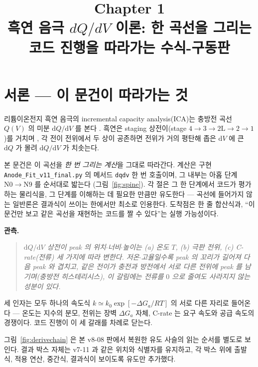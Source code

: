 \documentclass[11pt,a4paper]{article}
\title{\textbf{\LARGE Chapter 1}\\[0.35em]\Large 흑연 음극 $dQ/dV$ 이론: 한 곡선을 그리는 코드 진행을 따라가는 수식-구동판}
\author{}
\date{}
\newcommand{\dd}{\mathrm{d}}
\newcommand{\code}[1]{\texttt{#1}}
\begin{document}
\maketitle

\section*{서론 — 이 문건이 따라가는 것}
리튬이온전지 흑연 음극의 incremental capacity analysis(ICA)는 충방전 곡선 $Q(V)$ 의 미분
$\dd Q/\dd V$ 를 본다 \cite{bloom2005,dubarry2012}. 흑연은 staging 상전이(stage
$4\!\to\!3\!\to\!2\mathrm L\!\to\!2\!\to\!1$)를 거치며 \cite{dahn1991,ohzuku1993}, 각 전이 전위에서
두 상이 공존하면 전위가 거의 평탄해 좁은 $\dd V$ 에 큰 $\dd Q$ 가 몰려 $\dd Q/\dd V$ 가 치솟는다.

본 문건은 이 곡선을 \emph{한 번 그리는 계산}을 그대로 따라간다. 계산은 구현 \code{Anode\_Fit\_v11\_final.py}
의 메서드 \code{dqdv} 한 번 호출이며, 그 내부는 아홉 단계 $\mathrm N0\!\to\!\mathrm N9$ 를 순서대로 밟는다
(그림~\ref{fig:spine}). 각 절은 그 한 단계에서 코드가 평가하는 물리식을, 그 단계를 이해하는 데 필요한 만큼만
유도한다 — 곡선에 들어가지 않는 일반론은 결과식이 쓰이는 한에서만 최소로 인용한다. 도착점은 한 줄 합산식과,
``이 문건만 보고 같은 곡선을 재현하는 코드를 짤 수 있다''는 실행 가능성이다.

\textbf{관측.}
\begin{quote}\itshape
$\dd Q/\dd V$ 상전이 peak 의 위치$\cdot$너비$\cdot$높이는 (a) 온도 $T$, (b) 극판 전위, (c) C-rate(전류)
세 가지에 따라 변한다. 저온$\cdot$고율일수록 peak 의 꼬리가 길어져 다음 peak 와 겹치고, 같은 전이가 충전과 방전에서
서로 다른 전위에 peak 를 남기며(충방전 히스테리시스), 이 갈림에는 전류를 $0$ 으로 줄여도 사라지지 않는 성분이 있다.
\end{quote}

세 인자는 모두 하나의 속도식 $k\simeq k_0\exp[-\Delta G_a/RT]$ 의 서로 다른 자리로 들어온다 — 온도는 지수의 분모,
전위는 장벽 $\Delta G_a$ 자체, C-rate 는 요구 속도와 공급 속도의 경쟁이다. 코드 진행이 이 세 갈래를 차례로 닫는다.

그림~\ref{fig:derivechain} 은 본 v8-08 판에서 복원한 유도 사슬의 읽는 순서를 별도로 보인다. 결과 박스 자체는 v7-11 과 같은 위치와 식별자를 유지하고, 각 박스 위에 출발식, 적용 연산, 중간식, 결과식이 보이도록 유도만 추가했다.
\end{document}
